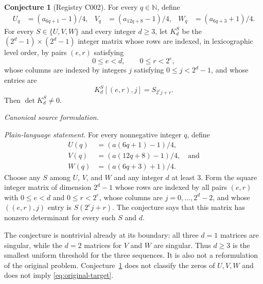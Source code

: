 \documentclass[11pt]{amsart}
\theoremstyle{definition}
\newtheorem{conjecture}[theorem]{Conjecture}
\begin{document}
\begin{conjecture}[Registry C002]\label{conj:C002}
For every $q\in\mathbb{N}$, define
\begin{align*}
 U_q&=(a_{6q+1}-1)/4,&
 V_q&=(a_{12q+8}-1)/4,&
 W_q&=(a_{6q+3}+1)/4.
\end{align*}
For every $S\in\{U,V,W\}$ and every integer $d\ge 3$, let $K_d^S$ be
the $(2^d-1)\times(2^d-1)$ integer matrix whose rows are indexed, in
lexicographic level order, by pairs $(e,r)$ satisfying
\[
 0\le e<d,
 \qquad 0\le r<2^e,
\]
whose columns are indexed by integers $j$ satisfying $0\le j<2^d-1$, and
whose entries are
\[
 K_d^S[(e,r),j]=S_{2^e j+r}.
\]
Then $\det K_d^S\ne0$.
\par\smallskip
\noindent\emph{Canonical source formulation.}
{\footnotesize\ttfamily\sloppy
{}\par}
\par\smallskip
\noindent\emph{Plain-language statement.} For every nonnegative integer $q$,
define
\begin{align*}
 U(q)&=(a(6q+1)-1)/4,\\
 V(q)&=(a(12q+8)-1)/4,\quad\text{and}\\
 W(q)&=(a(6q+3)+1)/4.
\end{align*}
Choose any $S$ among $U$, $V$, and $W$ and any integer $d$ at least $3$.
Form the square integer matrix of dimension $2^d-1$ whose rows are indexed
by all pairs $(e,r)$ with $0\le e<d$ and $0\le r<2^e$, whose columns are
$j=0,\ldots,2^d-2$, and whose $((e,r),j)$ entry is $S(2^e j+r)$.  The
conjecture says that this matrix has nonzero determinant for every such $S$
and $d$.
\end{conjecture}

The conjecture is nontrivial already at its boundary: all three $d=1$
matrices are singular, while the $d=2$ matrices for $V$ and $W$ are
singular.  Thus $d\geq3$ is the smallest uniform threshold for the three
sequences.  It is also not a reformulation of the original problem.
Conjecture~\ref{conj:C002} does not classify the zeros of $U,V,W$ and does
not imply \eqref{eq:original-target}.
\end{document}
